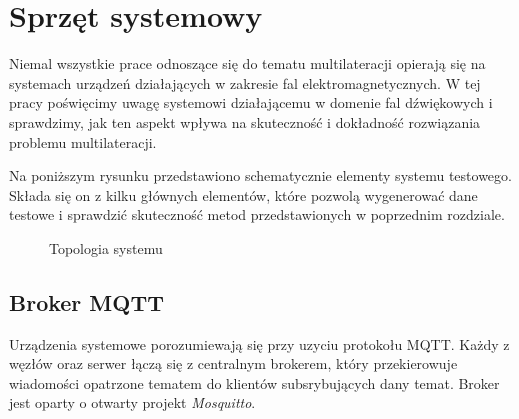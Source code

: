 \chapter{Sprzęt systemowy}\label{chap:hardware}

Niemal wszystkie prace odnoszące się do tematu multilateracji opierają się na systemach urządzeń działających w zakresie fal elektromagnetycznych. W tej pracy poświęcimy uwagę systemowi działającemu w domenie fal dźwiękowych i sprawdzimy, jak ten aspekt wpływa na skuteczność i dokładność rozwiązania problemu multilateracji.

Na poniższym rysunku przedstawiono schematycznie elementy systemu testowego. Składa się on z kilku głównych elementów, które pozwolą wygenerować dane testowe i sprawdzić skuteczność metod przedstawionych w poprzednim rozdziale.

\begin{figure}[H]
\centering
{}
\caption{Topologia systemu}
\label{pic:sys_topology}
\end{figure}

\section{Broker MQTT}

Urządzenia systemowe porozumiewają się przy uzyciu protokołu MQTT. Każdy z węzłów oraz serwer łączą się z centralnym brokerem, który przekierowuje wiadomości opatrzone tematem do klientów subsrybujących dany temat. Broker jest oparty o otwarty projekt \textit{Mosquitto}.

